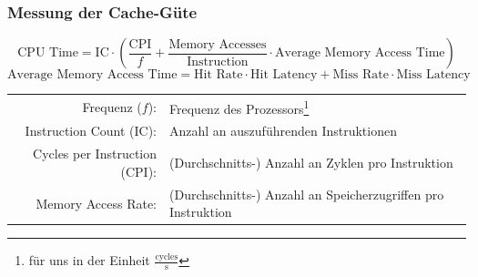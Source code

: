 \documentclass[
  german,            %
  aspectratio=169,    %
]{tumbeamer}
\begin{document}
\begin{frame}
	\frametitle{Messung der Cache-Güte}
	\vfill
	\begin{equation*}
	  \text{CPU Time} = \text{IC} \cdot \left(\dfrac{\text{CPI}}{f} + \frac{\text{Memory Accesses}}{\text{Instruction}} \cdot \text{Average Memory Access Time}\right)
	\end{equation*}
	\begin{equation*}
	  \text{Average Memory Access Time} = \text{Hit Rate} \cdot \text{Hit Latency} + \text{Miss Rate} \cdot \text{Miss Latency}
	\end{equation*}
	\vfill
	{\renewcommand{\arraystretch}{1.4}
		\begin{tabular}{rl}
			Frequenz ($f$): & Frequenz des Prozessors\footnote{für uns in der Einheit $\frac{\text{cycles}}{\text{s}}$}\\
			Instruction Count (IC): & Anzahl an auszuführenden Instruktionen\\
			Cycles per Instruction (CPI): & (Durchschnitts-) Anzahl an Zyklen pro Instruktion\\
			Memory Access Rate: & (Durchschnitts-) Anzahl an Speicherzugriffen pro Instruktion\\
	\end{tabular}}
\end{frame}
  
\end{document}
